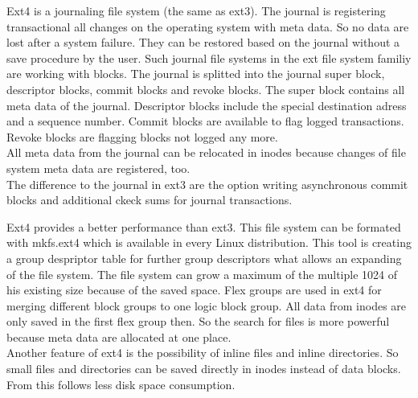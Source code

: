 Ext4 is a journaling file system (the same as ext3). The journal is registering transactional all changes on the operating system with meta data.
So no data  are lost after a system failure. They can be restored based on the journal without a save procedure by the user.
Such journal file systems in the ext file system familiy are working with blocks\cite[~p.20]{Seufert2015}.
The journal is splitted into the journal super block, descriptor blocks, commit blocks and revoke blocks.
The super block contains all meta data of the journal. Descriptor blocks include the special destination adress and a sequence number. 
Commit blocks are available to flag logged transactions.
Revoke blocks are flagging blocks not logged any more. \\
All meta data from the journal can be relocated in inodes because changes of file system meta data are registered, too. \\
The difference to the journal in ext3 are the option writing asynchronous commit blocks and additional ckeck sums for journal transactions\cite[~p.28]{Seufert2015}.

Ext4 provides a better performance than ext3. 
This file system can be formated with mkfs.ext4 which is available in every Linux distribution.
This tool is creating a group despriptor table for further group descriptors what allows an expanding of the file system. The file system can grow a maximum of the multiple 1024 of his existing size because of the saved space\cite[~p.21]{Seufert2015}.
Flex groups are used in ext4 for merging different block groups to one logic block group. All data from inodes are only saved in the first flex group then. 
So the search for files is more powerful because meta data are allocated at one place. \\

Another feature of ext4 is the possibility of inline files and inline directories. So small files and directories can be saved directly in inodes instead of data blocks. From this follows less disk space consumption\cite[p.24]{Seufert2015}.

